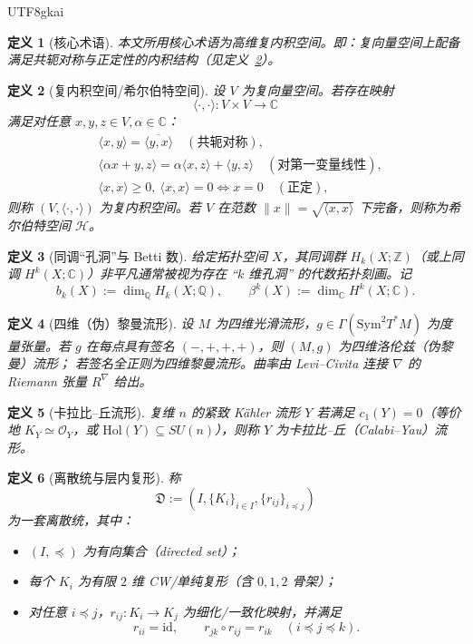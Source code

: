 \documentclass[12pt]{article}
\newtheorem{definition}{定义}[section]
\newcommand{\QQ}{\mathbb{Q}}
\begin{document}
\begin{CJK*}{UTF8}{gkai}
\begin{definition}[核心术语]
\label{def:D0}
本文所用核心术语为\emph{高维复内积空间}。即：复向量空间上配备满足共轭对称与正定性的内积结构（见定义~\ref{def:D1}）。
\end{definition}

\begin{definition}[复内积空间/希尔伯特空间]
\label{def:D1}
设 $V$ 为复向量空间。若存在映射
\[
\langle\cdot,\cdot\rangle:V\times V\to\mathbb C
\]
满足对任意 $x,y,z\in V,\alpha\in\mathbb C$：
\begin{align*}
&\langle x,y\rangle=\overline{\langle y,x\rangle}\quad(\text{共轭对称}),\\
&\langle \alpha x+y,z\rangle=\alpha\langle x,z\rangle+\langle y,z\rangle\quad(\text{对第一变量线性}),\\
&\langle x,x\rangle\ge 0,\ \langle x,x\rangle=0\Leftrightarrow x=0\quad(\text{正定}),
\end{align*}
则称 $(V,\langle\cdot,\cdot\rangle)$ 为\emph{复内积空间}。若 $V$ 在范数 $\|x\|=\sqrt{\langle x,x\rangle}$ 下完备，则称为\emph{希尔伯特空间}
  $\mathcal H$。
\end{definition}

\begin{definition}[同调“孔洞”与 Betti 数]
\label{def:D2}
给定拓扑空间 $X$，其同调群 $H_k(X;\mathbb Z)$（或上同调 $H^k(X;\mathbb C)$）非平凡通常被视为存在 ``$k$ 维孔洞'' 的代数拓扑刻画。记
\[
b_k(X):=\dim_{\QQ}H_k(X;\QQ),
\qquad
\beta^k(X):=\dim_{\mathbb C}H^k(X;\mathbb C).
\]
\end{definition}

\begin{definition}[四维（伪）黎曼流形]
\label{def:D3}
设 $M$ 为四维光滑流形，$g\in\Gamma(\mathrm{Sym}^2T^\ast M)$ 为度量张量。若 $g$ 在每点具有签名 $(-,+,+,+)$，则 $(M,g)$ 为四维\emph{洛伦兹}（伪黎曼）流形；
  若签名全正则为四维黎曼流形。曲率由 Levi--Civita 连接 $\nabla$ 的 Riemann 张量 $R^\nabla$ 给出。
\end{definition}

\begin{definition}[卡拉比--丘流形]
\label{def:D4}
复维 $n$ 的紧致 K\"ahler 流形 $Y$ 若满足 $c_1(Y)=0$（等价地 $K_Y\simeq\mathcal O_Y$，或 $\mathrm{Hol}(Y)\subseteq SU(n)$），则称 $Y$
  为\emph{卡拉比--丘}（Calabi--Yau）流形。
\end{definition}

\begin{definition}[离散统与层内复形]
\label{def:D5}
称
\[
\mathfrak D:=(I,\{K_i\}_{i\in I},\{r_{ij}\}_{i\preceq j})
\]
为一套\emph{离散统}，其中：
\begin{itemize}
\item $(I,\preceq)$ 为有向集合（directed set）；
\item 每个 $K_i$ 为有限 $2$ 维 CW/单纯复形（含 $0,1,2$ 骨架）；
\item 对任意 $i\preceq j$，$r_{ij}:K_i\to K_j$ 为细化/一致化映射，并满足
\[
r_{ii}=\mathrm{id},\qquad r_{jk}\circ r_{ij}=r_{ik}\quad (i\preceq j\preceq k).
\]
\end{itemize}
\end{definition}


\end{CJK*}
\end{document}
